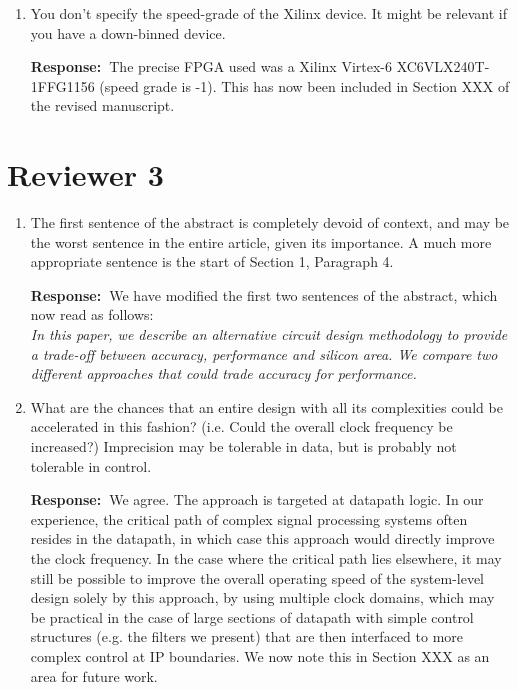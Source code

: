 \documentclass[a4paper, 11pt]{article}
\def\Response{\noindent \textbf{Response:~}}
\newcommand{\Question}[1]{\textcolor[rgb]{0.51,0.00,0.00}{#1}}
\newcommand{\PaperText}[1]{\emph{#1}}
\begin{document}
\begin{enumerate}
      \Response Thanks. This has been improved, we hope.
      
  \item \Question{You don't specify the speed-grade of the Xilinx device. It might be relevant if you have a down-binned device.}
      
      \Response The precise FPGA used was a Xilinx Virtex-6 XC6VLX240T-1FFG1156 (speed grade is -1). This has now been included in Section XXX of the revised manuscript.
\end{enumerate}


\section*{Reviewer 3}
\begin{enumerate}
  \item \Question{The first sentence of the abstract is completely devoid of context, and may be the worst sentence in the entire article, given its importance. A much more appropriate sentence is the start of Section 1, Paragraph 4.}
            
      \Response We have modified the first two sentences of the abstract, which now read as follows:\\
           
      \PaperText{In this paper, we describe an alternative circuit design methodology to provide a trade-off between accuracy, performance and silicon area. We compare two different approaches that could trade accuracy for performance.}\\

  \item \Question{What are the chances that an entire design with all its complexities could be accelerated in this fashion? (i.e. Could the overall clock frequency be increased?) Imprecision may be tolerable in data, but is probably not tolerable in control.}
            
      \Response We agree. The approach is targeted at datapath logic. In our experience, the critical path of complex signal processing systems often resides in the datapath, in which case this approach would directly improve the clock frequency. In the case where the critical path lies elsewhere, it may still be possible to improve the overall operating speed of the system-level design solely by this approach, by using multiple clock domains, which may be practical in the case of large sections of datapath with simple control structures (e.g. the filters we present) that are then interfaced to more complex control at IP boundaries. We now note this in Section XXX as an area for future work.
      

\end{enumerate}
\end{document}
